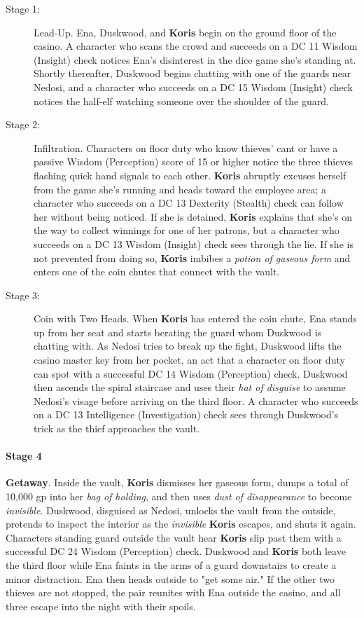\documentclass[a4paper, 11pt, bg=full, twocolumn, nooutline]{dndbook}
\begin{document}
\begin{description}
\item[Stage 1:] Lead-Up. Ena, Duskwood, and \textbf{Koris} begin on the ground floor of the casino. A character who scans the crowd and succeeds on a DC 11 Wisdom (Insight) check notices Ena's disinterest in the dice game she's standing at. Shortly thereafter, Duskwood begins chatting with one of the guards near Nedosi, and a character who succeeds on a DC 15 Wisdom (Insight) check notices the half-elf watching someone over the shoulder of the guard.
\item[Stage 2:] Infiltration. Characters on floor duty who know thieves' cant or have a passive Wisdom (Perception) score of 15 or higher notice the three thieves flashing quick hand signals to each other. \textbf{Koris} abruptly excuses herself from the game she's running and heads toward the employee area; a character who succeeds on a DC 13 Dexterity (Stealth) check can follow her without being noticed. If she is detained, \textbf{Koris} explains that she's on the way to collect winnings for one of her patrons, but a character who succeeds on a DC 13 Wisdom (Insight) check sees through the lie. If she is not prevented from doing so, \textbf{Koris} imbibes a \textit{potion of gaseous form} and enters one of the coin chutes that connect with the vault.
\item[Stage 3:] Coin with Two Heads. When \textbf{Koris} has entered the coin chute, Ena stands up from her seat and starts berating the guard whom Duskwood is chatting with. As Nedosi tries to break up the fight, Duskwood lifts the casino master key from her pocket, an act that a character on floor duty can spot with a successful DC 14 Wisdom (Perception) check. Duskwood then ascends the spiral staircase and uses their \textit{hat of disguise} to assume Nedosi's visage before arriving on the third floor. A character who succeeds on a DC 13 Intelligence (Investigation) check sees through Duskwood's trick as the thief approaches the vault.
\end{description}

\paragraph{Stage 4}

\textbf{Getaway}. Inside the vault, \textbf{Koris} dismisses her gaseous form, dumps a total of 10,000 gp into her \textit{bag of holding}, and then uses \textit{dust of disappearance} to become \textit{invisible}. Duskwood, disguised as Nedosi, unlocks the vault from the outside, pretends to inspect the interior as the \textit{invisible} \textbf{Koris} escapes, and shuts it again. Characters standing guard outside the vault hear \textbf{Koris} slip past them with a successful DC 24 Wisdom (Perception) check. Duskwood and \textbf{Koris} both leave the third floor while Ena faints in the arms of a guard downstairs to create a minor distraction. Ena then heads outside to "get some air." If the other two thieves are not stopped, the pair reunites with Ena outside the casino, and all three escape into the night with their spoils.
\end{document}
